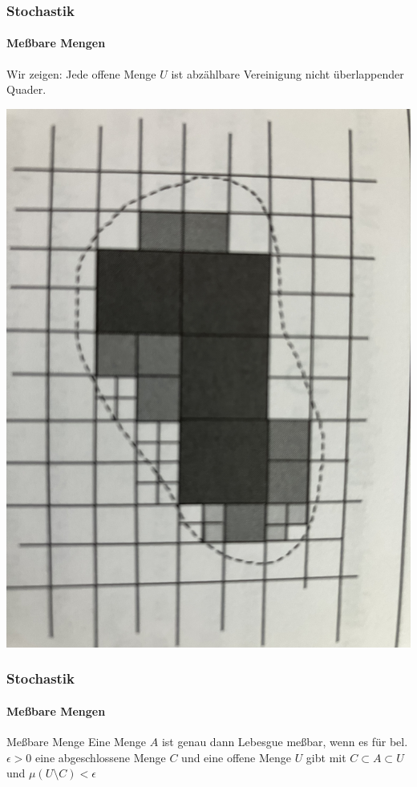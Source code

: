 \documentclass{beamer}
\begin{document}
 \begin{frame}
    \frametitle{Stochastik}
\framesubtitle{Meßbare Mengen}
Wir zeigen: Jede offene Menge $U$ ist abzählbare Vereinigung nicht überlappender Quader. 

\includegraphics[scale=0.04]{img/openmeasurable.jpg}
 \end{frame}


\begin{frame}
    \frametitle{Stochastik}
\framesubtitle{Meßbare Mengen}

\begin{block}{Meßbare Menge}
Eine Menge $A$ ist genau dann Lebesgue meßbar, 
wenn es für bel. $\epsilon > 0$ 
eine abgeschlossene Menge $C$ und eine offene Menge $U$ gibt 
mit $C \subset A \subset U$ und 
$\mu (U \setminus C ) < \epsilon $
\end{block}

 \end{frame}
\end{document}

